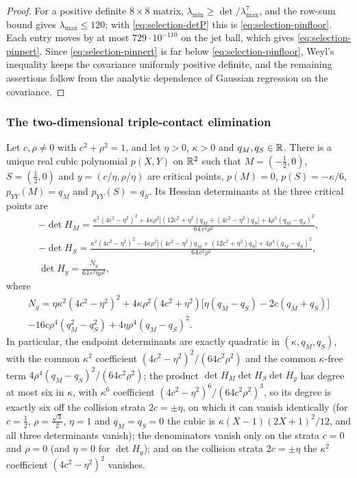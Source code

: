 \begin{proof}
For a positive definite $8\times8$ matrix, $\lambda_{\min}\ge\det/\lambda_{\max}^7$, and the row-sum bound gives $\lambda_{\max}\le120$; with \eqref{eq:selection-detP} this is \eqref{eq:selection-pinfloor}. Each entry moves by at most $729\cdot10^{-110}$ on the jet ball, which gives \eqref{eq:selection-pinpert}. Since \eqref{eq:selection-pinpert} is far below \eqref{eq:selection-pinfloor}, Weyl's inequality keeps the covariance uniformly positive definite, and the remaining assertions follow from the analytic dependence of Gaussian regression on the covariance.
\end{proof}

\subsubsection{The two-dimensional triple-contact elimination}

\begin{lemma}\label{lem:selection-elimination}
Let $c,\rho\ne0$ with $c^2+\rho^2=1$, and let $\eta>0$, $\kappa>0$ and $q_M,q_S\in\mathbb R$. There is a unique real cubic polynomial $p(X,Y)$ on $\mathbb R^2$ such that $M=(-\frac12,0)$, $S=(\frac12,0)$ and $y=(c/\eta,\rho/\eta)$ are critical points, $p(M)=0$, $p(S)=-\kappa/6$, $p_{YY}(M)=q_M$ and $p_{YY}(S)=q_S$. Its Hessian determinants at the three critical points are
\begin{gather}
-\det H_M=\frac{\kappa^2(4c^2-\eta^2)^2+4\kappa\rho^2\bigl[(12c^2+\eta^2)q_M+(4c^2-\eta^2)q_S\bigr]+4\rho^4(q_M-q_S)^2}{64\,c^2\rho^2},\label{eq:selection-B1}\\
-\det H_S=\frac{\kappa^2(4c^2-\eta^2)^2-4\kappa\rho^2\bigl[(4c^2-\eta^2)q_M+(12c^2+\eta^2)q_S\bigr]+4\rho^4(q_M-q_S)^2}{64\,c^2\rho^2},\label{eq:selection-B1S}\\
\det H_y=\frac{N_y}{64\,c^2\eta\rho^2},\label{eq:selection-B1y}
\end{gather}
where
\begin{multline}\label{eq:selection-Ny}
N_y=\eta\kappa^2(4c^2-\eta^2)^2+4\kappa\rho^2(4c^2+\eta^2)\bigl[\eta(q_M-q_S)-2c(q_M+q_S)\bigr]\\
-16c\rho^4(q_M^2-q_S^2)+4\eta\rho^4(q_M-q_S)^2 .
\end{multline}
In particular, the endpoint determinants are exactly quadratic in $(\kappa,q_M,q_S)$, with the common $\kappa^2$ coefficient $(4c^2-\eta^2)^2/(64c^2\rho^2)$ and the common $\kappa$-free term $4\rho^4(q_M-q_S)^2/(64c^2\rho^2)$; the product $\det H_M\det H_S\det H_y$ has degree at most six in $\kappa$, with $\kappa^6$ coefficient $(4c^2-\eta^2)^6/(64c^2\rho^2)^3$, so its degree is exactly six off the collision strata $2c=\pm\eta$, on which it can vanish identically (for $c=\frac12$, $\rho=\frac{\sqrt3}2$, $\eta=1$ and $q_M=q_S=0$ the cubic is $\kappa(X-1)(2X+1)^2/12$, and all three determinants vanish); the denominators vanish only on the strata $c=0$ and $\rho=0$ (and $\eta=0$ for $\det H_y$); and on the collision strata $2c=\pm\eta$ the $\kappa^2$ coefficient $(4c^2-\eta^2)^2$ vanishes.
\end{lemma}

